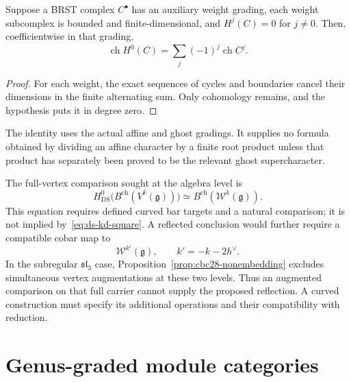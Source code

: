 \begin{proposition}
\label{cor:ds-character-compatibility}
Suppose a BRST complex $C^\bullet$ has an auxiliary weight grading, each weight subcomplex is bounded and finite-dimensional, and $H^j(C)=0$ for $j\ne0$.
Then, coefficientwise in that grading,
\begin{equation}\label{eq:ds-character}
 \operatorname{ch}H^0(C)=\sum_j(-1)^j\operatorname{ch}C^j.
\end{equation}
\end{proposition}
\begin{proof}
For each weight, the exact sequences of cycles and boundaries cancel their dimensions in the finite alternating sum.
Only cohomology remains, and the hypothesis puts it in degree zero.
\end{proof}
The identity uses the actual affine and ghost gradings.
It supplies no formula obtained by dividing an affine character by a finite root product unless that product has separately been proved to be the relevant ghost supercharacter.

\begin{remark}
\label{cor:ds-bar-level-shift}
The full-vertex comparison sought at the algebra level is
\begin{equation}\label{eq:ds-bar-level-shift}
 H^0_{\mathrm{DS}}\bigl(B^{\mathrm{ch}}(V^k(\mathfrak g))\bigr)
 \simeq B^{\mathrm{ch}}(\mathcal W^k(\mathfrak g)).
\end{equation}
This equation requires defined curved bar targets and a natural comparison; it is not implied by~\eqref{eq:ds-kd-square}.
A reflected conclusion would further require a compatible cobar map to
\begin{equation}\label{eq:ds-cobar-dual}
 \mathcal W^{k'}(\mathfrak g),\qquad k'=-k-2h^\vee.
\end{equation}
In the subregular $\mathfrak{sl}_3$ case, Proposition~\ref{prop:cbc28-nonembedding} excludes simultaneous vertex augmentations at these two levels.
Thus an augmented comparison on that full carrier cannot supply the proposed reflection.
A curved construction must specify its additional operations and their compatibility with reduction.
\end{remark}

\section{Genus-graded module categories}\label{sec:genus-graded-modules}

